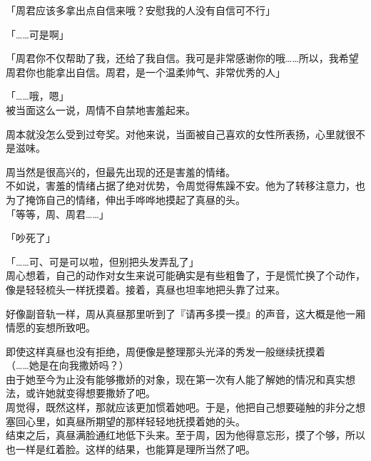 「周君应该多拿出点自信来哦？安慰我的人没有自信可不行」

「……可是啊」

「周君你不仅帮助了我，还给了我自信。我可是非常感谢你的哦……所以，我希望周君你也能拿出自信。周君，是一个温柔帅气、非常优秀的人」

「……哦，嗯」\\

被当面这么一说，周情不自禁地害羞起来。

周本就没怎么受到过夸奖。对他来说，当面被自己喜欢的女性所表扬，心里就很不是滋味。

周当然是很高兴的，但最先出现的还是害羞的情绪。\\

不如说，害羞的情绪占据了绝对优势，令周觉得焦躁不安。他为了转移注意力，也为了掩饰自己的情绪，伸出手哗哗地摸起了真昼的头。\\

「等等，周、周君……」

「吵死了」

「……可、可是可以啦，但别把头发弄乱了」\\

周心想着，自己的动作对女生来说可能确实是有些粗鲁了，于是慌忙换了个动作，像是轻轻梳头一样抚摸着。接着，真昼也坦率地把头靠了过来。

好像副音轨一样，周从真昼那里听到了『请再多摸一摸』的声音，这大概是他一厢情愿的妄想所致吧。

即使这样真昼也没有拒绝，周便像是整理那头光泽的秀发一般继续抚摸着\\

（……她是在向我撒娇吗？）\\

由于她至今为止没有能够撒娇的对象，现在第一次有人能了解她的情况和真实想法，或许她就变得想要撒娇了吧。\\

周觉得，既然这样，那就应该更加惯着她吧。于是，他把自己想要碰触的非分之想塞回心里，如真昼所期望的那样轻轻地抚摸着她的头。\\

结束之后，真昼满脸通红地低下头来。至于周，因为他得意忘形，摸了个够，所以也一样是红着脸。这样的结果，也能算是理所当然了吧。
